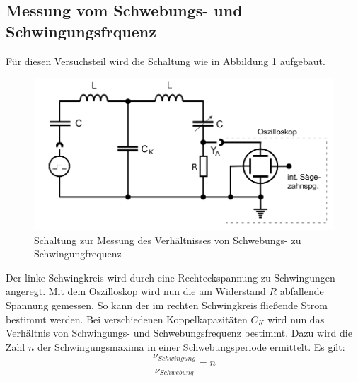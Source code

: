 \documentclass[11pt,ngerman,a4paper]{article}
\begin{document}
\subsection{Messung vom Schwebungs- und Schwingungsfrquenz}
Für diesen Versuchsteil wird die Schaltung wie in Abbildung \ref{abb2} aufgebaut.
\begin{figure}[h!]
\centering
\includegraphics[scale=0.5]{Abb/abb2.png}
\caption{Schaltung zur Messung des Verhältnisses von Schwebungs- zu Schwingungfrequenz }
\label{abb2}
\end{figure}
Der linke Schwingkreis wird durch eine Rechteckspannung zu Schwingungen angeregt. Mit dem Oszilloskop wird nun die am Widerstand $R$ abfallende Spannung gemessen. So kann der im rechten Schwingkreis fließende Strom bestimmt werden. Bei verschiedenen Koppelkapazitäten $C_K$ wird nun das Verhältnis von Schwingungs- und Schwebungsfrequenz bestimmt. Dazu wird die Zahl $n$ der Schwingungsmaxima in einer Schwebungsperiode ermittelt. Es gilt:
\begin{equation}
\frac{\nu_{Schwingung}}{\nu_{Schwebung}} = n
\end{equation}
\end{document}
